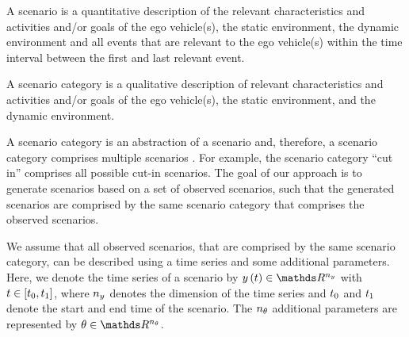 \begin{definition}[Scenario]
	\label{def:scenario}
	A scenario is a quantitative description of the relevant characteristics and activities and/or goals of the ego vehicle(s), the static environment, the dynamic environment and all events that are relevant to the ego vehicle(s) within the time interval between the first and last relevant event.
\end{definition}

\begin{definition}
	\label{def:scenario category}
	A scenario category is a qualitative description of relevant characteristics and activities and/or goals of the ego vehicle(s), the static environment, and the dynamic environment.
\end{definition}

A scenario category is an abstraction of a scenario and, therefore, a scenario category comprises multiple scenarios \autocite{degelder2020ontology}.
For example, the scenario category ``cut in'' comprises all possible cut-in scenarios.
The goal of our approach is to generate scenarios based on a set of observed scenarios, such that the generated scenarios are comprised by the same scenario category that comprises the observed scenarios.

We assume that all observed scenarios, that are comprised by the same scenario category, can be described using a time series and some additional parameters.
Here, we denote the time series of a scenario by $\timeseries{\time} \in \realnumbers^{\dimensiontimeseries}$ with $t \in [t_0, t_1]$, where $n_y$ denotes the dimension of the time series and $t_0$ and $t_1$ denote the start and end time of the scenario.
The $n_\theta$ additional parameters are represented by $\extraparameters \in \realnumbers^{\dimensionextraparameters}$.

